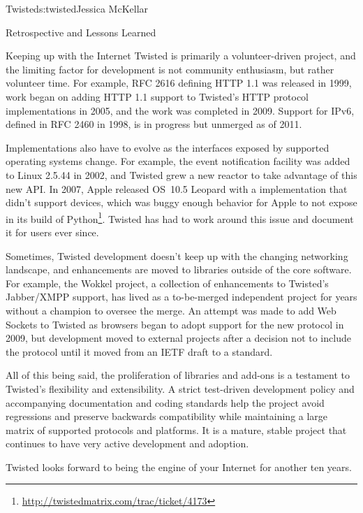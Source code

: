 \begin{aosachapter}{Twisted}{s:twisted}{Jessica McKellar}
\begin{aosasect1}{Retrospective and Lessons Learned}
\begin{aosasect2}{Keeping up with the Internet}
Twisted is primarily a volunteer-driven project, and the limiting factor for
development is not community enthusiasm, but rather volunteer time. For example,
RFC 2616 defining HTTP 1.1 was released in 1999, work began on adding HTTP 1.1
support to Twisted's HTTP protocol implementations in 2005, and the work was
completed in 2009.  Support for IPv6, defined in RFC 2460 in 1998, is in
progress but unmerged as of 2011.

Implementations also have to evolve as the interfaces exposed by
supported operating systems change. For example, the 
event notification facility was added to Linux 2.5.44 in 2002, and
Twisted grew a new  reactor to take advantage of this new
API. In 2007, Apple released OS~10.5 Leopard with a 
implementation that didn't support devices, which was buggy enough
behavior for Apple to not expose  in its build of
Python\footnote{\url{http://twistedmatrix.com/trac/ticket/4173}}.
Twisted has had to work around this issue and document it for users
ever since.

Sometimes, Twisted development doesn't keep up with the changing networking
landscape, and enhancements are moved to libraries outside of the core
software. For example, the Wokkel project, a collection of enhancements to
Twisted's Jabber/XMPP support, has lived as a to-be-merged independent project
for years without a champion to oversee the merge. An attempt was made to
add Web Sockets to Twisted as browsers began to adopt support for the new
protocol in 2009, but development moved to external projects after a decision
not to include the protocol until it moved from an IETF draft to a standard.

All of this being said, the proliferation of libraries and add-ons is a
testament to Twisted's flexibility and extensibility. A strict test-driven
development policy and accompanying documentation and coding standards help the
project avoid regressions and preserve backwards compatibility while maintaining
a large matrix of supported protocols and platforms. It is a mature, stable
project that continues to have very active development and adoption.

Twisted looks forward to being the engine of your Internet for another ten
years.

\end{aosasect2}

\end{aosasect1}

\end{aosachapter}
